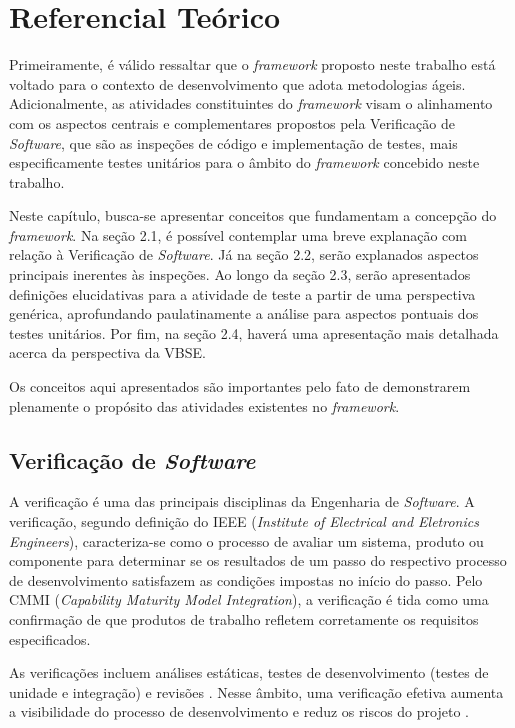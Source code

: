 \chapter{Referencial Teórico}

Primeiramente, é válido ressaltar que o \textit{framework} proposto neste trabalho está voltado para o contexto de desenvolvimento que adota metodologias ágeis. Adicionalmente, as atividades constituintes do \textit{framework} visam o alinhamento com os aspectos centrais e complementares propostos pela Verificação de \textit{Software}, que são as inspeções de código e implementação de testes, mais especificamente testes unitários para o âmbito do \textit{framework} concebido neste trabalho.

Neste capítulo, busca-se apresentar conceitos que fundamentam a concepção do \textit{framework}. Na seção 2.1, é possível contemplar uma breve explanação com relação à Verificação de \textit{Software}. Já na seção 2.2, serão explanados aspectos principais inerentes às inspeções. Ao longo da seção 2.3, serão apresentados definições elucidativas para a atividade de teste a partir de uma perspectiva genérica, aprofundando paulatinamente a análise para aspectos pontuais dos testes unitários. Por fim, na seção 2.4, haverá uma apresentação mais detalhada acerca da perspectiva da VBSE.

Os conceitos aqui apresentados são importantes pelo fato de demonstrarem plenamente o propósito das atividades existentes no \textit{framework}.

\section{Verificação de \textit{Software}}

A verificação é uma das principais disciplinas da Engenharia de \textit{Software}. A verificação, segundo definição do IEEE (\textit{Institute of Electrical and Eletronics Engineers}), caracteriza-se como o processo de avaliar um sistema, produto ou componente para determinar se os resultados de um passo do respectivo processo de desenvolvimento satisfazem as condições impostas no início do passo. Pelo CMMI (\textit{Capability Maturity Model Integration}), a verificação é tida como uma confirmação de que produtos de trabalho refletem corretamente os requisitos especificados.

As verificações incluem análises estáticas, testes de desenvolvimento (testes de unidade e integração) e revisões \cite{paulafilho}. Nesse âmbito, uma verificação efetiva aumenta a visibilidade do processo de desenvolvimento e reduz os riscos do projeto \cite{verificacao1}.

